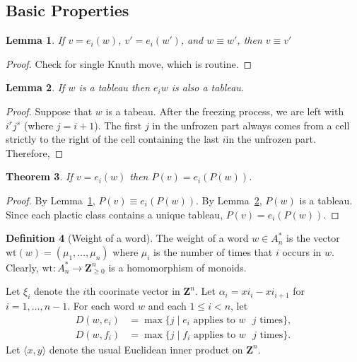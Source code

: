 \documentclass[12pt]{amsart}
\newcommand{\wt}{\mathrm{wt}}
\newcommand{\ip}[2]{\langle#1,#2\rangle}
\newtheorem{theorem}{Theorem}[subsection]
\newtheorem{lemma}[theorem]{Lemma}
\theoremstyle{definition}
\newtheorem{definition}[theorem]{Definition}
\theoremstyle{example}
\begin{document}
\subsection{Basic Properties}
\label{sec:basic-properties}
\begin{lemma}
  \label{lemma:knuth-plactic}
  If $v=e_i(w)$, $v'=e_i(w')$, and $w\equiv w'$, then $v\equiv v'$
\end{lemma}
\begin{proof}
  Check for single Knuth move, which is routine.
\end{proof}
\begin{lemma}
  \label{lemma:tab2tab}
  If $w$ is a tableau then $e_iw$ is also a tableau.
\end{lemma}
\begin{proof}
  Suppose that $w$ is a tabeau.
  After the freezing process, we are left with $i^rj^s$ (where $j=i+1$).
  The first $j$ in the unfrozen part always comes from a cell strictly to the right of the cell containing the last $i$in the unfrozen part.
  Therefore, 
\end{proof}
\begin{theorem}
  If $v=e_i(w)$ then $P(v)=e_i(P(w))$.
\end{theorem}
\begin{proof}
  By Lemma~\ref{lemma:knuth-plactic}, $P(v)\equiv e_i(P(w))$.
  By Lemma~\ref{lemma:tab2tab}, $P(w)$ is a tableau.
  Since each plactic class contains a unique tableau, $P(v)=e_i(P(w))$.
\end{proof}
\begin{definition}
  [Weight of a word]
  The weight of a word $w\in A_n^*$ is the vector $\wt(w)=(\mu_1,\dotsc,\mu_n)$ where $\mu_i$ is the number of times that $i$ occurs in $w$.
  Clearly, $\wt:A_n^*\to \mathbf Z_{\geq 0}^n$ is a homomorphism of monoids.
\end{definition}
Let $\xi_i$ denote the $i$th coorinate vector in $\mathbf Z^n$.
Let $\alpha_i=xi_i-xi_{i+1}$ for $i=1,\dotsc,n-1$.
For each word $w$ and each $1\leq i<n$, let
\begin{align*}
  D(w,e_i)&=\max\{j\mid e_i \text{ applies to $w$ $j$ times}\},\\
  D(w,f_i)&=\max\{j\mid f_i \text{ applies to $w$ $j$ times}\}.
\end{align*}
Let $\ip xy$ denote the usual Euclidean inner product on $\mathbf Z^n$.
\end{document}
